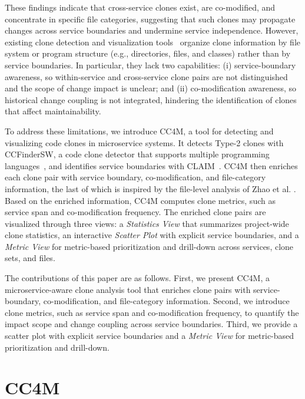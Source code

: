 \documentclass[conference]{IEEEtran}
\begin{document}
These findings indicate that cross-service clones exist, are co-modified, and concentrate in specific file categories, suggesting that such clones may propagate changes across service boundaries and undermine service independence. However, existing clone detection and visualization tools~\cite{Ueda2002Gemini,Asaduzzaman2011VisCad,Voinea2014SolidSDD} organize clone information by file system or program structure (e.g., directories, files, and classes) rather than by service boundaries. In particular, they lack two capabilities: (i) service-boundary awareness, so within-service and cross-service clone pairs are not distinguished and the scope of change impact is unclear; and (ii) co-modification awareness, so historical change coupling is not integrated, hindering the identification of clones that affect maintainability.

To address these limitations, we introduce \textsc{CC4M},
a tool for detecting and
visualizing code clones in microservice systems. It detects Type-2
clones with CCFinderSW, a code clone detector that supports multiple
programming languages~\cite{Semura2017CCFinderSW}, and identifies service
boundaries with CLAIM~\cite{Maggi2024CLAIM}. 
\textsc{CC4M} then enriches each clone pair with service boundary, co-modification, and file-category information, the last of which is inspired by the file-level analysis of Zhao et al. \cite{Zhao2022ICPC}.
Based on the enriched information, \textsc{CC4M} computes clone metrics,
such as service span and co-modification
frequency. The enriched clone pairs are visualized through three views:
a \emph{Statistics View} that summarizes project-wide clone statistics,
an interactive \emph{Scatter Plot} with explicit service boundaries,
and a \emph{Metric View} for metric-based prioritization and
drill-down across services, clone sets, and files.

The contributions of this paper are as follows.
First, we present \textsc{CC4M}, a microservice-aware clone analysis tool
that enriches clone pairs with service-boundary, co-modification,
and file-category information.
Second, we introduce clone metrics, such as service span and
co-modification frequency, to quantify the impact scope and change
coupling across service boundaries.
Third, we provide a scatter plot with explicit service boundaries and
a \emph{Metric View} for metric-based prioritization and drill-down.


\section{CC4M}
\label{sec:CC4M}
\end{document}
